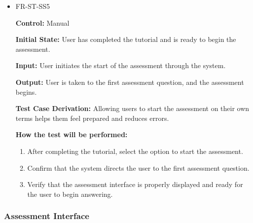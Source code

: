 \documentclass[12pt, titlepage]{article}
\begin{document}
\begin{itemize}
  \item FR-ST-SS5
    \begin{mdframed}[linewidth=0.5mm]
      \textbf{Control:} Manual \par
      \textbf{Initial State:} User has completed the tutorial and is ready to begin the assessment. \par
      \textbf{Input:} User initiates the start of the assessment through the system. \par
      \textbf{Output:} User is taken to the first assessment question, and the assessment begins. \par
      \textbf{Test Case Derivation:} Allowing users to start the assessment on their own terms helps them feel prepared and reduces errors. \par
      \textbf{How the test will be performed:}
      \begin{enumerate}[noitemsep]
        \item After completing the tutorial, select the option to start the assessment.
        \item Confirm that the system directs the user to the first assessment question.
        \item Verify that the assessment interface is properly displayed and ready for the user to begin answering.
      \end{enumerate}
    \end{mdframed}

\end{itemize}

\subsubsection{Assessment Interface}
\end{document}
